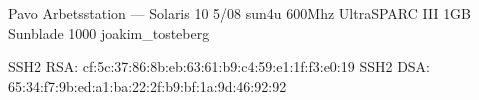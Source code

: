 \documentclass[a5paper]{article}
\begin{document}
   \computerdescription
       {Pavo}
       {Arbetsstation}
       {---}
       {Solaris 10 5/08}
       {sun4u}
       {600Mhz UltraSPARC III}
       {1GB}
       {Sunblade 1000}
       {joakim\_tosteberg}



   \sshfingerprintheading
   \begin{sshfingerprint}
SSH2 RSA: cf:5c:37:86:8b:eb:63:61:b9:c4:59:e1:1f:f3:e0:19
SSH2 DSA: 65:34:f7:9b:ed:a1:ba:22:2f:b9:bf:1a:9d:46:92:92
   \end{sshfingerprint}
\end{document}
